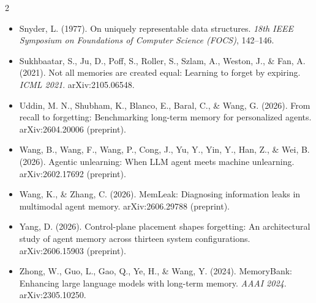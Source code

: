 {\begin{multicols}{2}
\begin{itemize}
\item Snyder, L. (1977). On uniquely representable data structures. \emph{18th IEEE Symposium on Foundations of Computer Science (FOCS)}, 142--146.
\item Sukhbaatar, S., Ju, D., Poff, S., Roller, S., Szlam, A., Weston, J., \& Fan, A. (2021). Not all memories are created equal: Learning to forget by expiring. \emph{ICML 2021}. arXiv:2105.06548.
\item Uddin, M. N., Shubham, K., Blanco, E., Baral, C., \& Wang, G. (2026). From recall to forgetting: Benchmarking long-term memory for personalized agents. arXiv:2604.20006 (preprint).
\item Wang, B., Wang, F., Wang, P., Cong, J., Yu, Y., Yin, Y., Han, Z., \& Wei, B. (2026). Agentic unlearning: When LLM agent meets machine unlearning. arXiv:2602.17692 (preprint).
\item Wang, K., \& Zhang, C. (2026). MemLeak: Diagnosing information leaks in multimodal agent memory. arXiv:2606.29788 (preprint).
\item Yang, D. (2026). Control-plane placement shapes forgetting: An architectural study of agent memory across thirteen system configurations. arXiv:2606.15903 (preprint).
\item Zhong, W., Guo, L., Gao, Q., Ye, H., \& Wang, Y. (2024). MemoryBank: Enhancing large language models with long-term memory. \emph{AAAI 2024}. arXiv:2305.10250.
\end{itemize}\end{multicols}\par}
